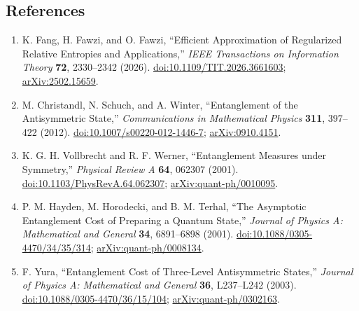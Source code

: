\subsection*{References}

\begin{enumerate}[label={},leftmargin=4.8em,labelsep=0.5em]
  \footnotesize
  \item[\textup{[FFF26]}]\label{ref:0c23-fang-fawzi-fawzi}
  K. Fang, H. Fawzi, and O. Fawzi,
  ``Efficient Approximation of Regularized Relative Entropies and
  Applications,''
  \emph{IEEE Transactions on Information Theory} \textbf{72}, 2330--2342 (2026).
  \href{https://doi.org/10.1109/TIT.2026.3661603}{doi:10.1109/TIT.2026.3661603};
  \href{https://arxiv.org/abs/2502.15659}{arXiv:2502.15659}.

  \item[\textup{[CSW12]}]\label{ref:0c23-christandl-schuch-winter}
  M. Christandl, N. Schuch, and A. Winter,
  ``Entanglement of the Antisymmetric State,''
  \emph{Communications in Mathematical Physics} \textbf{311}, 397--422 (2012).
  \href{https://doi.org/10.1007/s00220-012-1446-7}{doi:10.1007/s00220-012-1446-7};
  \href{https://arxiv.org/abs/0910.4151}{arXiv:0910.4151}.

  \item[\textup{[VW01]}]\label{ref:0c23-vollbrecht-werner}
  K. G. H. Vollbrecht and R. F. Werner,
  ``Entanglement Measures under Symmetry,''
  \emph{Physical Review A} \textbf{64}, 062307 (2001).
  \href{https://doi.org/10.1103/PhysRevA.64.062307}{doi:10.1103/PhysRevA.64.062307};
  \href{https://arxiv.org/abs/quant-ph/0010095}{arXiv:quant-ph/0010095}.

  \item[\textup{[HHT01]}]\label{ref:0c23-hayden-horodecki-terhal}
  P. M. Hayden, M. Horodecki, and B. M. Terhal,
  ``The Asymptotic Entanglement Cost of Preparing a Quantum State,''
  \emph{Journal of Physics A: Mathematical and General} \textbf{34},
  6891--6898 (2001).
  \href{https://doi.org/10.1088/0305-4470/34/35/314}{doi:10.1088/0305-4470/34/35/314};
  \href{https://arxiv.org/abs/quant-ph/0008134}{arXiv:quant-ph/0008134}.

  \item[\textup{[Yur03]}]\label{ref:0c23-yura}
  F. Yura,
  ``Entanglement Cost of Three-Level Antisymmetric States,''
  \emph{Journal of Physics A: Mathematical and General} \textbf{36},
  L237--L242 (2003).
  \href{https://doi.org/10.1088/0305-4470/36/15/104}{doi:10.1088/0305-4470/36/15/104};
  \href{https://arxiv.org/abs/quant-ph/0302163}{arXiv:quant-ph/0302163}.


\end{enumerate}
